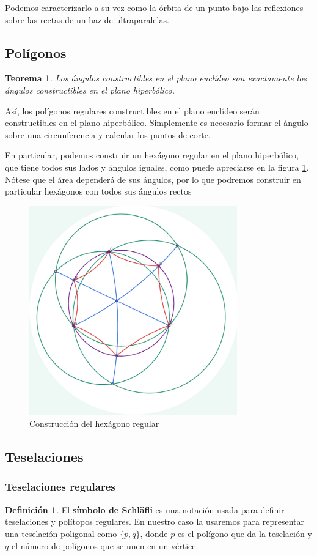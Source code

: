 \documentclass{article}
\theoremstyle{plain}
\newtheorem{theorem}{Teorema}
\theoremstyle{definition}
\newtheorem{definition}{Definición}
\theoremstyle{remark}
\begin{document}
Podemos caracterizarlo a su vez como la órbita de un punto bajo las reflexiones
sobre las rectas de un haz de ultraparalelas.\cite{coxeter}



\subsection{Polígonos}
\begin{theorem}
  Los ángulos constructibles en el plano euclídeo son exactamente los ángulos
  constructibles en el plano hiperbólico. \cite{jagy95}
\end{theorem}

Así, los polígonos regulares constructibles en el plano euclídeo serán
constructibles en el plano hiperbólico. Simplemente es necesario
formar el ángulo sobre una circunferencia y calcular los puntos de corte.

En particular, podemos construir un hexágono regular en el plano
hiperbólico, que tiene todos sus lados y ángulos iguales, como puede
apreciarse en la figura \ref{hexagon}. Nótese que el área dependerá de
sus ángulos, por lo que podremos construir en particular hexágonos con
todos sus ángulos rectos

\begin{figure}[ht!]
\centering
\includegraphics[width=90mm]{./hexagon.png}
\caption{Construcción del hexágono regular \label{hexagon}}
\end{figure}

\subsection{Teselaciones}
\subsubsection{Teselaciones regulares}
\begin{definition}
  El \textbf{símbolo de Schläfli} es una notación usada para definir
  teselaciones y polítopos regulares. En nuestro caso la usaremos para
  representar una teselación poligonal como $\{p,q\}$, donde $p$ es el
  polígono que da la teselación y $q$ el número de polígonos que se unen
  en un vértice.
\end{definition}
\end{document}
